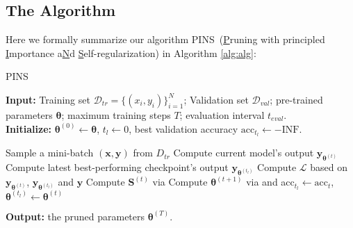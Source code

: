 \subsection{The Algorithm}
Here we formally summarize our algorithm PINS~(\underline{P}runing with principled \underline{I}mportance a\underline{N}d \underline{S}elf-regularization) in Algorithm \ref{alg:alg}:
\begin{algorithm}[h]
	\caption{PINS} %
	\hspace*{0.02in} {\bf Input:} %
	Training set $\mathcal{D}_{tr}=\{(x_i, y_i)\}_{i=1}^N$; Validation set $\mathcal{D}_{val}$; pre-trained parameters $\bm{\theta}$;  maximum training steps $T$; evaluation interval $t_{eval}$. \\
	\textbf{Initialize:} $\bm{\theta}^{(0)}\leftarrow \bm{\theta}$, $t_{l}\leftarrow 0$, best validation accuracy $\text{acc}_{t_l}\leftarrow -\text{INF}$.
	\begin{algorithmic}[1]
				 \State Sample a mini-batch  $(\bm{x}, \bm{y})$ from $D_{tr}$
				 \State Compute current model's output $\bm{y}_{\bm{\theta}^{(t)}}$
				 \State Compute latest best-performing checkpoint's output $\bm{y}_{\bm{\theta}^{(t_l)}}$
				 \State Compute $\mathcal{L}$ based on $\bm{y}_{\bm{\theta}^{(t)}}$, $\bm{y}_{\bm{\theta}^{(t_l)}}$ and $\bm{y}$
				 \State Compute $\bm{S}^{(t)}$ via 
				 \State Compute $\bm{\theta}^{(t+1)}$ via  and 
				  \State acc$_{t_l}\leftarrow\text{acc}_{t}$, $\bm{\theta}^{(t_l)}\leftarrow\bm{\theta}^{(t)}$
				 \EndIf
		\EndFor

	\end{algorithmic}
	\hspace*{0.02in} {\bf Output:} %
the pruned parameters $\bm{\theta}^{(T)}$.
	\label{alg:alg}
\end{algorithm}

